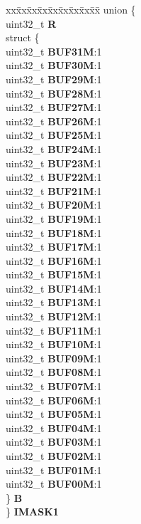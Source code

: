\begin{DoxyCompactItemize}
\begin{tabbing}
\end{tabbing}\item 
\mbox{\label{structFLEXCAN__tag_ae43e8b8154062f2b0c231a1be64a61b6}} 
\begin{tabbing}
xx\=xx\=xx\=xx\=xx\=xx\=xx\=xx\=xx\=\kill
union \{\\
\>uint32\_t {\bfseries R}\\
\>struct \{\\
\>\>uint32\_t {\bfseries BUF31M}:1\\
\>\>uint32\_t {\bfseries BUF30M}:1\\
\>\>uint32\_t {\bfseries BUF29M}:1\\
\>\>uint32\_t {\bfseries BUF28M}:1\\
\>\>uint32\_t {\bfseries BUF27M}:1\\
\>\>uint32\_t {\bfseries BUF26M}:1\\
\>\>uint32\_t {\bfseries BUF25M}:1\\
\>\>uint32\_t {\bfseries BUF24M}:1\\
\>\>uint32\_t {\bfseries BUF23M}:1\\
\>\>uint32\_t {\bfseries BUF22M}:1\\
\>\>uint32\_t {\bfseries BUF21M}:1\\
\>\>uint32\_t {\bfseries BUF20M}:1\\
\>\>uint32\_t {\bfseries BUF19M}:1\\
\>\>uint32\_t {\bfseries BUF18M}:1\\
\>\>uint32\_t {\bfseries BUF17M}:1\\
\>\>uint32\_t {\bfseries BUF16M}:1\\
\>\>uint32\_t {\bfseries BUF15M}:1\\
\>\>uint32\_t {\bfseries BUF14M}:1\\
\>\>uint32\_t {\bfseries BUF13M}:1\\
\>\>uint32\_t {\bfseries BUF12M}:1\\
\>\>uint32\_t {\bfseries BUF11M}:1\\
\>\>uint32\_t {\bfseries BUF10M}:1\\
\>\>uint32\_t {\bfseries BUF09M}:1\\
\>\>uint32\_t {\bfseries BUF08M}:1\\
\>\>uint32\_t {\bfseries BUF07M}:1\\
\>\>uint32\_t {\bfseries BUF06M}:1\\
\>\>uint32\_t {\bfseries BUF05M}:1\\
\>\>uint32\_t {\bfseries BUF04M}:1\\
\>\>uint32\_t {\bfseries BUF03M}:1\\
\>\>uint32\_t {\bfseries BUF02M}:1\\
\>\>uint32\_t {\bfseries BUF01M}:1\\
\>\>uint32\_t {\bfseries BUF00M}:1\\
\>\} {\bfseries B}\\
\} {\bfseries IMASK1}\\


\end{tabbing}
\end{DoxyCompactItemize}
